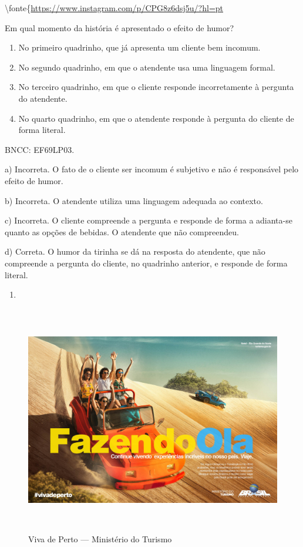 {\textbackslash fonte\{\url{https://www.instagram.com/p/CPG8z6dsj5u/?hl=pt}

Em qual momento da história é apresentado o efeito de humor?

\begin{enumerate}
\def\labelenumi{\alph{enumi})}
\item
  No primeiro quadrinho, que já apresenta um cliente bem incomum.
\item
  No segundo quadrinho, em que o atendente usa uma linguagem formal.
\item
  No terceiro quadrinho, em que o cliente responde incorretamente à
  pergunta do atendente.
\item
  No quarto quadrinho, em que o atendente responde à pergunta do cliente
  de forma literal.
\end{enumerate}

BNCC: EF69LP03.

a) Incorreta. O fato de o cliente ser incomum é subjetivo e não é
responsável pelo efeito de humor.

b) Incorreta. O atendente utiliza uma linguagem adequada ao contexto.

c) Incorreta. O cliente compreende a pergunta e responde de forma a
adianta-se quanto as opções de bebidas. O atendente que não compreendeu.

d) Correta. O humor da tirinha se dá na resposta do atendente, que não
compreende a pergunta do cliente, no quadrinho anterior, e responde de
forma literal.

\begin{enumerate}
\def\labelenumi{\arabic{enumi}.}
\setcounter{enumi}{12}
\tightlist
\item
\end{enumerate}

\begin{figure}
\centering
\includegraphics[width=5.90556in,height=3.93403in]{./imgSAEB_6_POR/media/image43.jpeg}
\caption{Viva de Perto --- Ministério do Turismo}
\end{figure}

}
